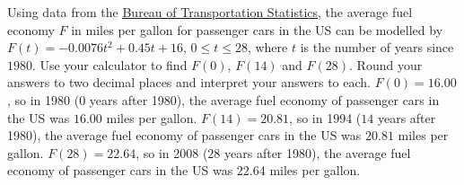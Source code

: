{Using data from the  \href{http://www.bts.gov/publications/national_transportation_statistics/html/table_04_23.html}{\underline{Bureau of Transportation Statistics}}, the average fuel economy $F$ in miles per gallon for passenger cars in the US can be modelled by  $F(t) = -0.0076t^2+0.45t + 16$, $0 \leq t \leq 28$, where $t$ is the number of years since $1980$. Use your calculator to find $F(0)$, $F(14)$ and $F(28)$.  Round your answers to two decimal places and interpret your answers to each. }
{$F(0) = 16.00$, so in 1980 ($0$ years after 1980), the average fuel economy of passenger cars in the US was $16.00$ miles per gallon.  $F(14) = 20.81$, so in 1994 ($14$ years after 1980), the average fuel economy of passenger cars in the US was $20.81$ miles per gallon.  $F(28) = 22.64$, so in 2008 ($28$ years after 1980), the average fuel economy of passenger cars in the US was $22.64$ miles per gallon.}